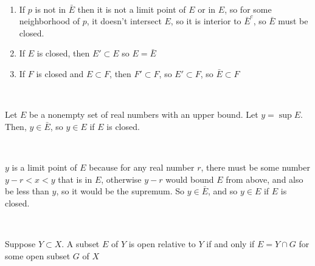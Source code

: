 \documentclass{article}
\begin{document}
\begin{solution}
\

\begin{enumerate}
    \item If $p$ is not in $\bar{E}$ then it is not a limit point of $E$ or in $E$, so for some neighborhood of $p$, it doesn't intersect $E$, so it is interior to $\bar{E}^c$, so $\bar{E}$ must be closed.
    \item If $E$ is closed, then $E' \subset E$ so $E = \bar{E}$
    \item If $F$ is closed and $E \subset F$, then $F' \subset F$, so $E' \subset F$, so $\bar{E} \subset F$
\end{enumerate}
\end{solution}

\begin{theorem}
\

Let $E$ be a nonempty set of real numbers with an upper bound. Let $y = \sup E$. Then, $y \in \bar{E}$, so $y \in E$ if $E$ is closed. 
\end{theorem}

\begin{customproof}
\

$y$ is a limit point of $E$ because for any real number $r$, there must be some number $y-r < x < y$ that is in $E$, otherwise $y-r$ would bound $E$ from above, and also be less than $y$, so it would be the supremum. So $y \in \bar{E}$, and so $y \in E$ if $E$ is closed.
\end{customproof}

\begin{theorem}
\

Suppose $Y \subset X$. A subset $E$ of $Y$ is open relative to $Y$ if and only if $E = Y \cap G$ for some open subset $G$ of $X$
\end{theorem}
\end{document}
